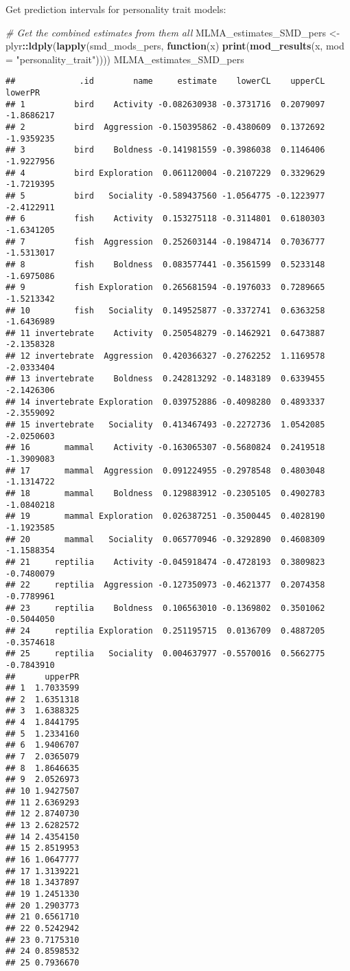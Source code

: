 \documentclass[]{article}
\newenvironment{Shaded}{\begin{snugshade}}{\end{snugshade}}
\newcommand{\KeywordTok}[1]{\textcolor[rgb]{0.13,0.29,0.53}{\textbf{#1}}}
\newcommand{\DataTypeTok}[1]{\textcolor[rgb]{0.13,0.29,0.53}{#1}}
\newcommand{\StringTok}[1]{\textcolor[rgb]{0.31,0.60,0.02}{#1}}
\newcommand{\CommentTok}[1]{\textcolor[rgb]{0.56,0.35,0.01}{\textit{#1}}}
\newcommand{\ControlFlowTok}[1]{\textcolor[rgb]{0.13,0.29,0.53}{\textbf{#1}}}
\newcommand{\OperatorTok}[1]{\textcolor[rgb]{0.81,0.36,0.00}{\textbf{#1}}}
\newcommand{\NormalTok}[1]{#1}
\begin{document}
Get prediction intervals for personality trait models:

\begin{Shaded}
\begin{Highlighting}[]
  \CommentTok{# Get the combined estimates from them all}
\NormalTok{  MLMA_estimates_SMD_pers <-}\StringTok{ }\NormalTok{plyr}\OperatorTok{::}\KeywordTok{ldply}\NormalTok{(}\KeywordTok{lapply}\NormalTok{(smd_mods_pers, }\ControlFlowTok{function}\NormalTok{(x) }\KeywordTok{print}\NormalTok{(}\KeywordTok{mod_results}\NormalTok{(x, }\DataTypeTok{mod =} \StringTok{"personality_trait"}\NormalTok{))))}
\NormalTok{      MLMA_estimates_SMD_pers}
\end{Highlighting}
\end{Shaded}

\begin{verbatim}
##             .id        name     estimate    lowerCL    upperCL    lowerPR
## 1          bird    Activity -0.082630938 -0.3731716  0.2079097 -1.8686217
## 2          bird  Aggression -0.150395862 -0.4380609  0.1372692 -1.9359235
## 3          bird    Boldness -0.141981559 -0.3986038  0.1146406 -1.9227956
## 4          bird Exploration  0.061120004 -0.2107229  0.3329629 -1.7219395
## 5          bird   Sociality -0.589437560 -1.0564775 -0.1223977 -2.4122911
## 6          fish    Activity  0.153275118 -0.3114801  0.6180303 -1.6341205
## 7          fish  Aggression  0.252603144 -0.1984714  0.7036777 -1.5313017
## 8          fish    Boldness  0.083577441 -0.3561599  0.5233148 -1.6975086
## 9          fish Exploration  0.265681594 -0.1976033  0.7289665 -1.5213342
## 10         fish   Sociality  0.149525877 -0.3372741  0.6363258 -1.6436989
## 11 invertebrate    Activity  0.250548279 -0.1462921  0.6473887 -2.1358328
## 12 invertebrate  Aggression  0.420366327 -0.2762252  1.1169578 -2.0333404
## 13 invertebrate    Boldness  0.242813292 -0.1483189  0.6339455 -2.1426306
## 14 invertebrate Exploration  0.039752886 -0.4098280  0.4893337 -2.3559092
## 15 invertebrate   Sociality  0.413467493 -0.2272736  1.0542085 -2.0250603
## 16       mammal    Activity -0.163065307 -0.5680824  0.2419518 -1.3909083
## 17       mammal  Aggression  0.091224955 -0.2978548  0.4803048 -1.1314722
## 18       mammal    Boldness  0.129883912 -0.2305105  0.4902783 -1.0840218
## 19       mammal Exploration  0.026387251 -0.3500445  0.4028190 -1.1923585
## 20       mammal   Sociality  0.065770946 -0.3292890  0.4608309 -1.1588354
## 21     reptilia    Activity -0.045918474 -0.4728193  0.3809823 -0.7480079
## 22     reptilia  Aggression -0.127350973 -0.4621377  0.2074358 -0.7789961
## 23     reptilia    Boldness  0.106563010 -0.1369802  0.3501062 -0.5044050
## 24     reptilia Exploration  0.251195715  0.0136709  0.4887205 -0.3574618
## 25     reptilia   Sociality  0.004637977 -0.5570016  0.5662775 -0.7843910
##      upperPR
## 1  1.7033599
## 2  1.6351318
## 3  1.6388325
## 4  1.8441795
## 5  1.2334160
## 6  1.9406707
## 7  2.0365079
## 8  1.8646635
## 9  2.0526973
## 10 1.9427507
## 11 2.6369293
## 12 2.8740730
## 13 2.6282572
## 14 2.4354150
## 15 2.8519953
## 16 1.0647777
## 17 1.3139221
## 18 1.3437897
## 19 1.2451330
## 20 1.2903773
## 21 0.6561710
## 22 0.5242942
## 23 0.7175310
## 24 0.8598532
## 25 0.7936670
\end{verbatim}
\end{document}
